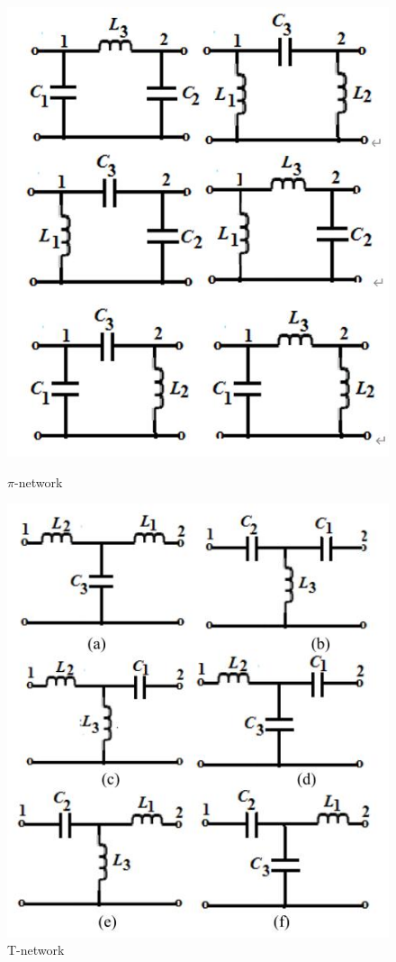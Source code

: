 \documentclass[conference]{IEEEtran}
\begin{document}
\begin{figure}[!h]
	\centering
	\begin{minipage}{0.49\linewidth}
		\centering
		\includegraphics[width=0.7\linewidth]{fig/pic4-2.jpg}
		\caption{$\pi$-network}
		\label{fig4-2}%
	\end{minipage}
	\begin{minipage}{0.49\linewidth}
		\centering
		\includegraphics[width=0.7\linewidth]{fig/pic4-3.jpg}
		\caption{T-network}
		\label{fig4-3}%
	\end{minipage}
\end{figure}
\end{document}
